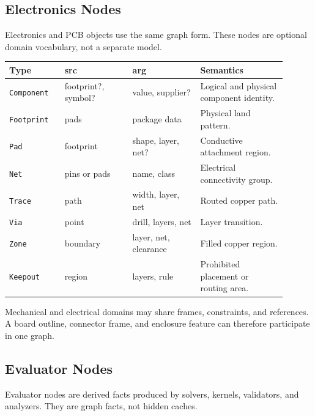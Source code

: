 \documentclass[11pt]{article}
\newcommand{\Type}[1]{\texttt{#1}}
\begin{document}
\subsection{Electronics Nodes}

Electronics and PCB objects use the same graph form. These nodes are optional domain vocabulary, not a separate model.

\begin{center}
\small
\begin{tabular}{@{}p{0.18\linewidth}p{0.22\linewidth}p{0.22\linewidth}p{0.28\linewidth}@{}}
\hline
\textbf{Type} & \textbf{src} & \textbf{arg} & \textbf{Semantics} \\
\hline
\Type{Component} & footprint?, symbol? & value, supplier? & Logical and physical component identity. \\
\Type{Footprint} & pads & package data & Physical land pattern. \\
\Type{Pad} & footprint & shape, layer, net? & Conductive attachment region. \\
\Type{Net} & pins or pads & name, class & Electrical connectivity group. \\
\Type{Trace} & path & width, layer, net & Routed copper path. \\
\Type{Via} & point & drill, layers, net & Layer transition. \\
\Type{Zone} & boundary & layer, net, clearance & Filled copper region. \\
\Type{Keepout} & region & layers, rule & Prohibited placement or routing area. \\
\hline
\end{tabular}
\end{center}

Mechanical and electrical domains may share frames, constraints, and references. A board outline, connector frame, and enclosure feature can therefore participate in one graph.

\subsection{Evaluator Nodes}

Evaluator nodes are derived facts produced by solvers, kernels, validators, and analyzers. They are graph facts, not hidden caches.
\end{document}
